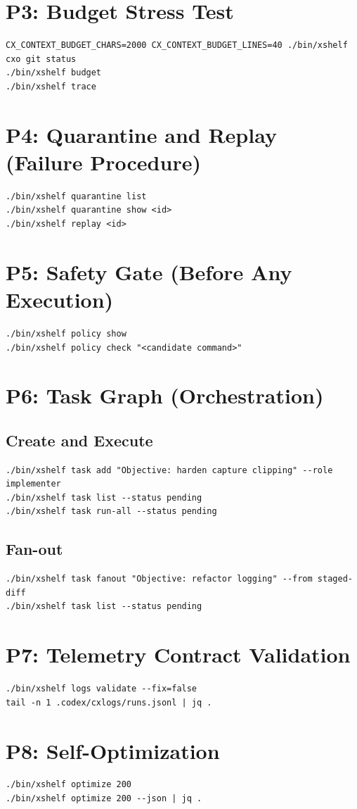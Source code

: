 \documentclass[11pt]{article}
\begin{document}
\section{P3: Budget Stress Test}
\begin{lstlisting}[style=cx]
CX_CONTEXT_BUDGET_CHARS=2000 CX_CONTEXT_BUDGET_LINES=40 ./bin/xshelf cxo git status
./bin/xshelf budget
./bin/xshelf trace
\end{lstlisting}

\section{P4: Quarantine and Replay (Failure Procedure)}
\begin{lstlisting}[style=cx]
./bin/xshelf quarantine list
./bin/xshelf quarantine show <id>
./bin/xshelf replay <id>
\end{lstlisting}

\section{P5: Safety Gate (Before Any Execution)}
\begin{lstlisting}[style=cx]
./bin/xshelf policy show
./bin/xshelf policy check "<candidate command>"
\end{lstlisting}

\section{P6: Task Graph (Orchestration)}
\subsection*{Create and Execute}
\begin{lstlisting}[style=cx]
./bin/xshelf task add "Objective: harden capture clipping" --role implementer
./bin/xshelf task list --status pending
./bin/xshelf task run-all --status pending
\end{lstlisting}

\subsection*{Fan-out}
\begin{lstlisting}[style=cx]
./bin/xshelf task fanout "Objective: refactor logging" --from staged-diff
./bin/xshelf task list --status pending
\end{lstlisting}

\section{P7: Telemetry Contract Validation}
\begin{lstlisting}[style=cx]
./bin/xshelf logs validate --fix=false
tail -n 1 .codex/cxlogs/runs.jsonl | jq .
\end{lstlisting}

\section{P8: Self-Optimization}
\begin{lstlisting}[style=cx]
./bin/xshelf optimize 200
./bin/xshelf optimize 200 --json | jq .
\end{lstlisting}
\end{document}
